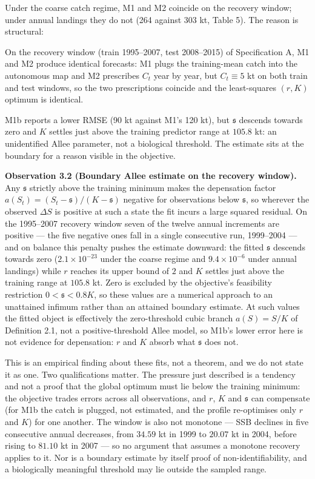 \documentclass[11pt]{article}
\begin{document}
Under the coarse catch regime, M1 and M2 coincide on the recovery
window; under annual landings they do not (264 against 303 kt, Table 5). The reason is structural:

On the recovery window (train 1995--2007, test 2008--2015) of
Specification A, M1 and M2 produce identical forecasts: M1 plugs the
training-mean catch into the autonomous map and M2 prescribes \(C_t\)
year by year, but \(C_t\equiv 5\) kt on both train and test windows, so
the two prescriptions coincide and the least-squares \((r,K)\) optimum is
identical.

M1b reports a lower RMSE (90 kt against M1's 120 kt), but
\(\mathfrak s\) descends towards zero and \(K\) settles just above the
training predictor range at \(105.8\) kt: an
unidentified Allee parameter, not a biological threshold. The estimate
sits at the boundary for a reason visible in the objective.

\textbf{Observation 3.2 (Boundary Allee estimate on the recovery
window).} Any \(\mathfrak s\) strictly above the training minimum makes
the depensation factor
\(a(S_t)=(S_t-\mathfrak s)/(K-\mathfrak s)\) negative for observations
below \(\mathfrak s\), so wherever the observed \(\Delta S\) is positive
at such a state the fit incurs a large squared residual. On the
1995--2007 recovery window seven of the twelve annual increments are
positive --- the five negative ones fall in a single consecutive run,
1999--2004 --- and on balance this penalty pushes the estimate downward: the fitted \(\mathfrak s\)
descends towards zero (\(2.1\times10^{-23}\) under the coarse regime and
\(9.4\times10^{-6}\) under annual landings) while \(r\) reaches its
upper bound of \(2\) and \(K\) settles just above the training range at
\(105.8\) kt. Zero is excluded by the objective's feasibility
restriction \(0 < \mathfrak s < 0.8K\), so these values are a numerical
approach to an unattained infimum rather than an attained boundary
estimate. At such values the fitted object is effectively the
zero-threshold cubic branch \(a(S)=S/K\) of Definition 2.1, not a
positive-threshold Allee model, so M1b's lower error here is not
evidence for depensation: \(r\) and \(K\) absorb what \(\mathfrak s\)
does not.

This is an empirical finding about these fits, not a theorem, and we do
not state it as one. Two qualifications matter. The pressure just
described is a tendency and not a proof that the global optimum must lie
below the training minimum: the objective trades errors across all
observations, and \(r\), \(K\) and \(\mathfrak s\) can compensate (for M1b the catch is
plugged, not estimated, and the profile re-optimises only \(r\) and
\(K\))
for one another. The window is also not monotone --- SSB declines in
five consecutive annual decreases, from \(34.59\) kt in 1999 to
\(20.07\) kt in 2004, before rising to \(81.10\) kt in 2007 --- so no argument that
assumes a monotone recovery applies to it. Nor is a boundary estimate by
itself proof of non-identifiability, and a biologically meaningful
threshold may lie outside the sampled range.
\end{document}
